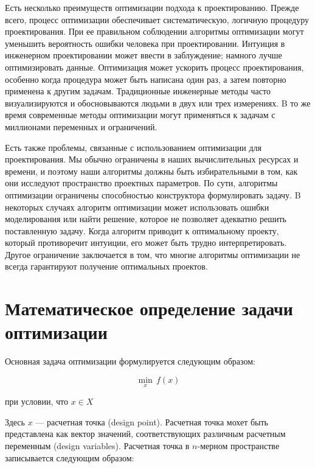 Есть несколько преимуществ оптимизации подхода к проектированию. Прежде всего, процесс оптимизации обеспечивает систематическую, логичную процедуру проектирования. При ее правильном соблюдении алгоритмы оптимизации могут уменьшить вероятность ошибки человека при проектировании. Интуиция в инженерном проектировании может ввести в заблуждение; намного лучше оптимизировать данные. Оптимизация может ускорить процесс проектирования, особенно когда процедура может быть написана один раз, а затем повторно применена к другим задачам. Традиционные инженерные методы часто визуализируются и обосновываются людьми в двух или трех измерениях. B то же время современные методы оптимизации могут применяться к задачам с миллионами переменных и ограничений.
   
Есть также проблемы, связанные с использованием оптимизации для проектирования. Мы обычно ограничены в наших вычислительных ресурсах и времени, и поэтому наши алгоритмы должны быть избирательными в том, как они исследуют пространство проектных параметров. По сути, алгоритмы оптимизации ограничены способностью конструктора формулировать задачу. B некоторых случаях алгоритм оптимизации может использовать ошибки моделирования или найти решение, которое не позволяет адекватно решить поставленную задачу. Когда алгоритм приводит к оптимальному проекту, который противоречит интуиции, его может быть трудно интерпретировать. Другое ограничение заключается в том, что многие алгоритмы оптимизации не всегда гарантируют получение оптимальных проектов. 

\section{Математическое определение задачи оптимизации}

Основная задача оптимизации формулируется следующим образом:

\begin{equation}
  \min_{x} \, f(x)
  \label{eq:taskOptimizationMin}
\end{equation}

\begin{center}
при условии, что $x \in X$
\end{center}

Здесь $x$ — расчетная точка (design point). Расчетная точка мохет быть представлена как вектор значений, соответствующих различным расчетным переменным (design variables). Расчетная точка в $n$-мерном пространстве записывается следующим образом:

